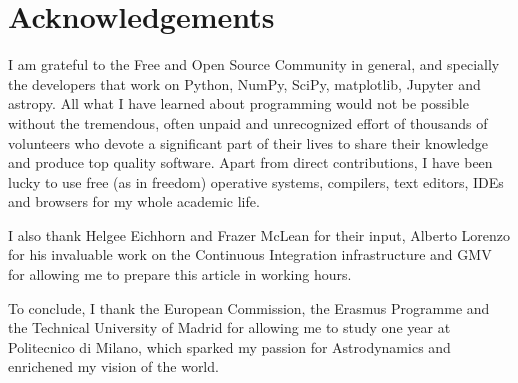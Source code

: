 \section{Acknowledgements}

\small{I am grateful to the Free and Open Source Community in general, and specially the developers that work on Python, NumPy, SciPy, matplotlib, Jupyter and astropy. All what I have learned about programming would not be possible without the tremendous, often unpaid and unrecognized effort of thousands of volunteers who devote a significant part of their lives to share their knowledge and produce top quality software. Apart from direct contributions, I have been lucky to use free (as in freedom) operative systems, compilers, text editors, IDEs and browsers for my whole academic life.

I also thank Helgee Eichhorn and Frazer McLean for their input, Alberto Lorenzo for his invaluable work on the Continuous Integration infrastructure and GMV for allowing me to prepare this article in working hours.

To conclude, I thank the European Commission, the Erasmus Programme and the Technical University of Madrid for allowing me to study one year at Politecnico di Milano, which sparked my passion for Astrodynamics and enrichened my vision of the world.
}